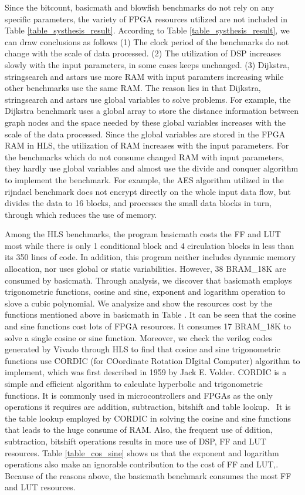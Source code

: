 \documentclass[conference]{IEEEtran}
\begin{document}
Since the bitcount, basicmath and blowfish benchmarks do not rely on any specific parameters, the variety of FPGA resources utilized are not included in Table \ref{table_systhesis_result}.
According to Table \ref{table_systhesis_result}, we can draw conclusions as follows
(1) The clock period of the benchmarks do not change with the scale of data processed.
(2) The utilization of DSP increases slowly with the input parameters, in some cases keeps unchanged.
(3) Dijkstra, stringsearch and astars use more RAM with input paramters increasing while other benchmarks use the same RAM.
The reason lies in that Dijkstra, stringsearch and astars use global variables to solve problems.
For example, the Dijkstra benchmark uses a global array to store the distance information between graph nodes and the space needed by these global variables increases with the scale of the data processed.
Since the global variables are stored in the FPGA RAM in HLS, the utilization of RAM increases with the input parameters.
For the benchmarks which do not consume changed RAM with input parameters, they hardly use global variables and almost use the divide and conquer algorithm to implement the benchmark.
For example, the AES algorithm utilized in the rijndael benchmark does not encrypt directly on the whole input data flow, but divides the data to 16 blocks, and processes the small data blocks in turn, through which reduces the use of memory.

Among the HLS benchmarks, the program basicmath costs the FF and LUT most while there is only 1 conditional block and 4 circulation blocks in less than its 350 lines of code.
In addition, this program neither includes dynamic memory allocation, nor uses global or static variabilities.
However, 38 BRAM\_18K are consumed by basicmath.
Through analysis, we discover that basicmath employs trigonometric functions, cosine and sine, exponent and logarithm operation to slove a cubic polynomial.
We analysize and show the resources cost by the functions mentioned above in basicmath in Table .
It can be seen that the cosine and sine functions cost lots of FPGA resources. It consumes 17 BRAM\_18K to solve a single cosine or sine function.
Moreover, we check the verilog codes generated by Vivado through HLS to find that cosine and sine trigonometric functions use CORDIC (for COordinate Rotation DIgital Computer) algorithm to implement, which was first described in 1959 by Jack E. Volder. CORDIC is a simple and efficient algorithm to calculate hyperbolic and trigonometric functions.
It is commonly used in microcontrollers and FPGAs as the only operations it requires are addition, subtraction, bitshift and table lookup.~\cite{volder1959cordic}
It is the table lookup employed by CORDIC in solving the cosine and sine functions that leads to the huge consume of RAM.
Also, the frequent use of ddition, subtraction, bitshift operations results in more use of DSP, FF and LUT resources.
Table \ref{table_cos_sine} shows us that the exponent and logarithm operations also make an ignorable contribution to the cost of FF and LUT,.
Because of the reasons above, the basicmath benchmark consumes the most FF and LUT resources.
\end{document}
